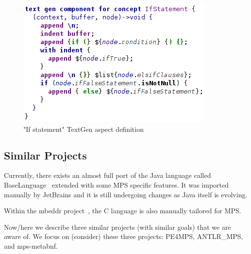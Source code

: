 \begin{figure}[ht]
	\centering
	\includegraphics[scale=0.6]{./images/if_statement_textgen.png}
	\caption{"If statement" TextGen aspect definition}
	\label{fig:if_statement_textgen}
\end{figure}


\subsection{Similar Projects}

Currently, there exists an almost full port of the Java language called BaseLanguage~\cite{ref:BaseLanguage} extended with some MPS specific features.
It was imported manually by JetBrains and it is still undergoing changes as Java itself is evolving.

Within the mbeddr project~\cite{ref:mbeddr}, the C language is also manually tailored for MPS.

Now/here we describe three similar projects (with similar goals) that we are aware of.
We focus on (consider) these three projects: PE4MPS, ANTLR{\_}MPS, and mps-metabnf.

